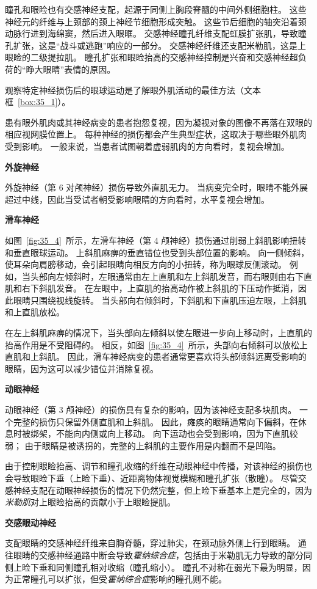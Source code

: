 瞳孔和眼睑也有交感神经支配，起源于同侧上胸段脊髓的中间外侧细胞柱。
这些神经元的纤维与上颈部的颈上神经节细胞形成突触。
这些节后细胞的轴突沿着颈动脉行进到海绵窦，然后进入眼眶。
交感神经瞳孔纤维支配虹膜扩张肌，导致瞳孔扩张，这是“战斗或逃跑”响应的一部分。
交感神经纤维还支配米勒肌，这是上眼睑的二级提拉肌。
瞳孔扩张和眼睑抬高的交感神经控制是兴奋和交感神经超负荷的“睁大眼睛”表情的原因。



观察特定神经损伤后的眼球运动是了解眼外肌活动的最佳方法（文本框~\ref{box:35_1}）。


\begin{proposition}[眼外肌肉或神经损伤] \label{box:35_1}

\quad \quad 患有眼外肌肉或其神经病变的患者抱怨复视，因为凝视对象的图像不再落在双眼的相应视网膜位置上。
每种神经的损伤都会产生典型症状，这取决于哪些眼外肌肉受到影响。
一般来说，当患者试图朝着虚弱肌肉的方向看时，复视会增加。


\quad \quad \textbf{外旋神经}

\quad \quad 外旋神经（第 6 对颅神经）损伤导致外直肌无力。
当病变完全时，眼睛不能外展超过中线，因此当受试者朝受影响眼睛的方向看时，水平复视会增加。


\quad \quad \textbf{滑车神经}

\quad \quad 如图~\ref{fig:35_4}~所示，左滑车神经（第 4 颅神经）损伤通过削弱上斜肌影响扭转和垂直眼球运动。
上斜肌麻痹的垂直错位也受到头部位置的影响。
向一侧倾斜，使耳朵向肩膀移动，会引起眼睛向相反方向的小扭转，称为眼球反侧滚动。
例如，当头部向左倾斜时，左眼通常由左上直肌和左上斜肌发音，而右眼则由右下直肌和右下斜肌发音。
在左眼中，上直肌的抬高动作被上斜肌的下压动作抵消，因此眼睛只围绕视线旋转。
当头部向右倾斜时，下斜肌和下直肌压迫左眼，上斜肌和上直肌放松。


\quad \quad 在左上斜肌麻痹的情况下，当头部向左倾斜以使左眼进一步向上移动时，上直肌的抬高作用是不受阻碍的。
相反，如图~\ref{fig:35_4}~所示，头部向右倾斜可以放松上直肌和上斜肌。
因此，滑车神经病变的患者通常更喜欢将头部倾斜远离受影响的眼睛，因为这可以减少错位并消除复视。


\quad \quad \textbf{动眼神经}

\quad \quad 动眼神经（第 3 颅神经）的损伤具有复杂的影响，因为该神经支配多块肌肉。
一个完整的损伤只保留外侧直肌和上斜肌。
因此，瘫痪的眼睛通常向下偏斜，在休息时被绑架，不能向内侧或向上移动。
向下运动也会受到影响，因为下直肌较弱；
由于眼睛是被诱拐的，完整的上斜肌的主要作用是内翻而不是凹陷。


\quad \quad 由于控制眼睑抬高、调节和瞳孔收缩的纤维在动眼神经中传播，对该神经的损伤也会导致眼睑下垂（上睑下垂）、近距离物体视觉模糊和瞳孔扩张（散瞳）。
尽管交感神经支配在动眼神经损伤的情况下仍然完整，但上睑下垂基本上是完全的，因为\textit{米勒肌}对上眼睑抬高的贡献小于上眼睑提肌。


\quad \quad \textbf{交感眼动神经}

\quad \quad 支配眼睛的交感神经纤维来自胸脊髓，穿过肺尖，在颈动脉外侧上行到眼睛。
通往眼睛的交感神经通路中断会导致\textit{霍纳综合症}，包括由于米勒肌无力导致的部分同侧上睑下垂和同侧瞳孔相对收缩（瞳孔缩小）。
瞳孔不对称在弱光下最为明显，因为正常瞳孔可以扩张，但受\textit{霍纳综合症}影响的瞳孔则不能。
	
\end{proposition}



